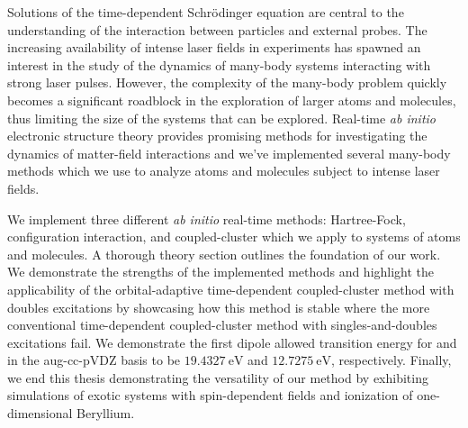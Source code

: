 Solutions of the time-dependent Schrödinger equation are central to the
understanding of the interaction between particles and external probes.
The increasing availability of intense laser fields in experiments has spawned
an interest in the study of the dynamics of many-body systems interacting with
strong laser pulses.
However, the complexity of the many-body problem quickly becomes a significant
roadblock in the exploration of larger atoms and molecules, thus limiting the
size of the systems that can be explored.
Real-time \textit{ab initio} electronic structure theory provides promising
methods for investigating the dynamics of matter-field interactions and we've
implemented several many-body methods which we use to analyze atoms and
molecules subject to intense laser fields.

We implement three different \emph{ab initio} real-time methods: Hartree-Fock,
configuration interaction, and coupled-cluster which we apply to systems of
atoms and molecules.
A thorough theory section outlines the foundation of our work.
We demonstrate the strengths of the implemented methods and highlight the
applicability of the orbital-adaptive time-dependent coupled-cluster method with
doubles excitations by showcasing how this method is stable where the more
conventional time-dependent coupled-cluster method with singles-and-doubles
excitations fail.
We demonstrate the first dipole allowed transition energy for  and
 in the aug-cc-pVDZ basis to be $\SI{19.4327}{\electronvolt}$ and
$\SI{12.7275}{\electronvolt}$, respectively.
Finally, we end this thesis demonstrating the versatility of our method by
exhibiting simulations of exotic systems with spin-dependent fields and
ionization of one-dimensional Beryllium.
